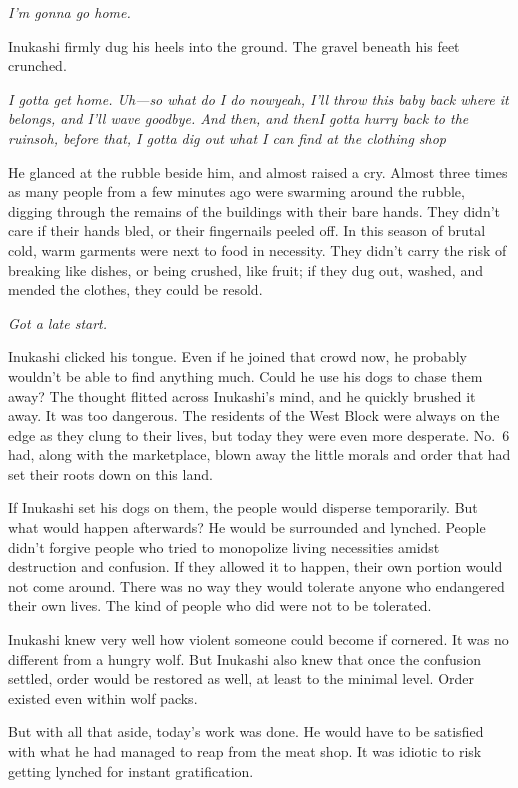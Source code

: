 \emph{I'm gonna go home.}

Inukashi firmly dug his heels into the ground. The gravel beneath his
feet crunched.

\emph{I gotta get home. Uh---so what do I do now\el yeah, I'll throw this baby
back where it belongs, and I'll wave goodbye. And then, and then\el I
gotta hurry back to the ruins\el oh, before that, I gotta dig out what I
can find at the clothing shop\el }

He glanced at the rubble beside him, and almost raised a cry. Almost
three times as many people from a few minutes ago were swarming around
the rubble, digging through the remains of the buildings with their bare
hands. They didn't care if their hands bled, or their fingernails peeled
off. In this season of brutal cold, warm garments were next to food in
necessity. They didn't carry the risk of breaking like dishes, or being
crushed, like fruit; if they dug out, washed, and mended the clothes,
they could be resold.

\emph{Got a late start.}

Inukashi clicked his tongue. Even if he joined that crowd now, he
probably wouldn't be able to find anything much. Could he use his dogs
to chase them away? The thought flitted across Inukashi's mind, and he
quickly brushed it away. It was too dangerous. The residents of the West
Block were always on the edge as they clung to their lives, but today
they were even more desperate. No.~6 had, along with the marketplace,
blown away the little morals and order that had set their roots down on
this land.

If Inukashi set his dogs on them, the people would disperse temporarily.
But what would happen afterwards? He would be surrounded and lynched.
People didn't forgive people who tried to monopolize living necessities
amidst destruction and confusion. If they allowed it to happen, their
own portion would not come around. There was no way they would tolerate
anyone who endangered their own lives. The kind of people who did were
not to be tolerated.

Inukashi knew very well how violent someone could become if cornered. It
was no different from a hungry wolf. But Inukashi also knew that once
the confusion settled, order would be restored as well, at least to the
minimal level. Order existed even within wolf packs.

But with all that aside, today's work was done. He would have to be
satisfied with what he had managed to reap from the meat shop. It was
idiotic to risk getting lynched for instant gratification.

